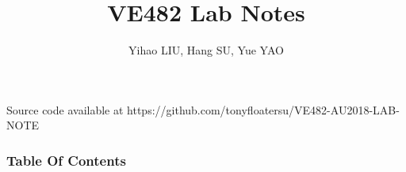 \documentclass[slidestop,compress,mathserif]{beamer}
\title{VE482 Lab Notes}
\author{Yihao LIU, Hang SU, Yue YAO}
\institute{VE482 AU18 TA Group}
\begin{document}
\begin{frame} %
	\titlepage
	\tiny{Source code available at https://github.com/tonyfloatersu/VE482-AU2018-LAB-NOTE}
\end{frame}

\begin{frame}[allowframebreaks]
    \small
    \frametitle{Table Of Contents}
    \tableofcontents
\end{frame}

\end{document}
